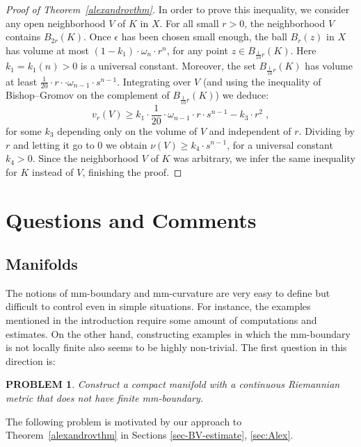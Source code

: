 \documentclass[12pt,leqno,intlimits]{amsart}
\numberwithin{equation}{section}
\newtheorem{quest}[thm]{PROBLEM}
\theoremstyle{definition}
\theoremstyle{remark}
\newcommand{\tref}[1]{Theorem~\ref{#1}}
\begin{document}
\begin{proof}[Proof of Theorem~\ref{alexandrovthm}]
	In order to prove this inequality, we consider any open neighborhood $V$ of $K$ in $X$.   For all small $r>0$, the neighborhood $V$ contains $B_{2r} (K)$.  Once $\epsilon$ has been chosen small enough,   the ball   $B_r (z)$ in $X$ has  volume at most
   $ (1-k_1)  \cdot \omega _n \cdot  r^n$,  for
	any point $z\in  B_{\frac 1 {10} r} (K)$. Here  $ k_1=k_1(n)>0 $ is a universal constant.
	 Moreover,  the set  $B_{\frac 1 {10} r} (K)$  has volume at least $\frac 1 {20} \cdot r\cdot \cdot \omega _{n-1} \cdot   s^{n-1}$.
	Integrating over $V$  (and using the inequality of Bishop--Gromov on the complement of   $B_{\frac 1 {10} r} (K)$) we deduce:
	$$v_r (V) \geq k_1\cdot \frac 1 {20} \cdot \omega _{n-1}  \cdot r\cdot s^{n-1}  -  k_3 \cdot r^2 \;,$$
	for some $k_3$ depending only on the volume of $V$ and independent of $r$.
	Dividing by $r$ and letting it go to $0$ we obtain $\nu (V) \geq k_4\cdot s^{n-1}$, for a universal constant $k_4>0$.
 Since the neighborhood $V$ of $K$ was arbitrary,
	we infer the same inequality for $K$ instead of $V$, finishing the proof.
\end{proof}














\section{Questions and Comments} \label{sec:final}
\subsection{Manifolds}
The notions of mm-boundary and mm-curvature are very easy to define but   difficult to control even in  simple situations.
For instance, the examples mentioned in the introduction require some amount of computations and estimates.  On the other hand, constructing examples in which the mm-boundary is not locally finite  also seems to be highly non-trivial.  The first  question in this direction is:


\begin{quest}
 Construct a compact manifold with a continuous Riemannian metric
that does not have finite mm-boundary.
\end{quest}

 The following problem is motivated by our approach to \tref{alexandrovthm} in Sections \ref{sec-BV-estimate}, \ref{sec:Alex}.
\end{document}
